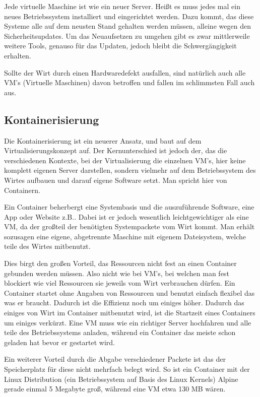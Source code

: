 Jede virtuelle Maschine ist wie ein neuer Server. Heißt es muss jedes mal ein neues Betriebssystem installiert und eingerichtet werden. Dazu kommt, das diese Systeme alle auf dem neusten Stand gehalten werden müssen,
alleine wegen den Sicherheitsupdates. Um das Neuaufsetzen zu umgehen gibt es zwar mittlerweile weitere Tools, genauso für das Updaten, jedoch bleibt die Schwergängigkeit erhalten.

Sollte der Wirt durch einen Hardwaredefekt ausfallen, sind natürlich auch alle VM's (Virtuelle Maschinen) davon betroffen und fallen im schlimmsten Fall auch aus.

\subsection{Kontainerisierung}
Die Kontainerisierung ist ein neuerer Ansatz, und baut auf dem Virtualisierungskonzept auf. Der Kernunterschied ist jedoch der, das die verschiedenen Kontexte, bei der Virtualisierung die einzelnen VM's,
hier keine komplett eigenen Server darstellen, sondern vielmehr auf dem Betriebssystem des Wirtes aufbauen und darauf eigene Software setzt. Man spricht hier von Containern.

Ein Container beherbergt eine Systembasis und die auszuführende Software, eine App oder Website z.B.. Dabei ist er jedoch wesentlich leichtgewichtiger als eine VM, 
da der großteil der benötigten Systempackete vom Wirt kommt. Man erhält sozusagen eine eigene, abgetrennte Maschine mit eigenem Dateisystem, welche teile des Wirtes mitbenutzt.

Dies birgt den großen Vorteil, das Ressourcen nicht fest an einen Container gebunden werden müssen. Also nicht wie bei VM's, bei welchen man fest blockiert wie viel Ressourcen sie jeweils vom Wirt verbrauchen dürfen.
Ein Container startet ohne Angaben von Ressourcen und benutzt einfach flexibel das was er braucht. Dadurch ist die Effizienz noch um einiges höher.
Dadurch das einiges von Wirt im Container mitbenutzt wird, ist die Startzeit eines Containers um einiges verkürzt. Eine VM muss wie ein richtiger Server hochfahren und alle teile des Betriebssystems anladen, während ein Container das meiste schon geladen hat bevor er gestartet wird.

Ein weiterer Vorteil durch die Abgabe verschiedener Packete ist das der Speicherplatz für diese nicht mehrfach belegt wird. So ist ein Container mit der
Linux Distribution (ein Betriebssystem auf Basis des Linux Kernels) Alpine gerade einmal 5 Megabyte groß, während eine VM etwa 130 MB wären.

